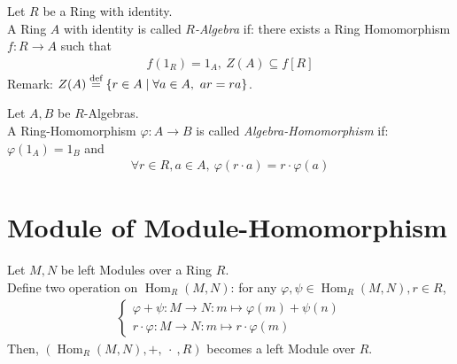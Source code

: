 \begin{definition}
    Let $R$ be a Ring with identity. \\
    A Ring $A$ with identity is called \textit{$R$-Algebra} if: there exists a Ring Homomorphism $f:R \to A$ such that
    \begin{align*}
        f(1_R) = 1_A,\ Z(A) \subseteq f[R]
    \end{align*}
    Remark: $Z(A) \overset{\textnormal{def}}{=} \{r \in A \mid \forall a \in A,\ ar = ra\}$.
\end{definition}

\begin{definition}
    Let $A, B$ be $R$-Algebras. \\
    A Ring-Homomorphism $\varphi:A \to B$ is called \textit{Algebra-Homomorphism} if: $\varphi(1_A) = 1_B$ and
    \begin{align*}
        \forall r \in R, a \in A,\ \varphi(r \cdot a) = r \cdot \varphi(a)
    \end{align*}
\end{definition}

\newpage
\section{Module of Module-Homomorphism}
\begin{definition}
    Let $M,N$ be left Modules over a Ring $R$. \\
    Define two operation on $\operatorname{Hom}_R(M,N)$: for any $\varphi, \psi \in \operatorname{Hom}_R(M,N), r \in R$,
    \begin{align*}
        \begin{cases}
            \varphi + \psi:M \to N:m \mapsto \varphi(m) + \psi(n) \\
            r \cdot \varphi: M \to N : m \mapsto r \cdot \varphi(m)
        \end{cases}
    \end{align*}
    Then, $(\operatorname{Hom}_R(M,N), +, \ \cdot\ , R)$ becomes a left Module over $R$.
\end{definition}

\newpage
